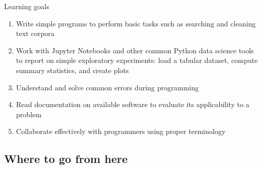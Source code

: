 \documentclass[aspectratio=169,usenames,dvipsnames]{beamer}
\begin{document}
\begin{frame}{Learning goals}
    \begin{enumerate}
        \item Write simple programs to perform basic tasks such as searching
            and cleaning text corpora
        \item Work with Jupyter Notebooks and other common Python data science
            tools to report on simple exploratory experiments:
            load a tabular dataset, compute summary statistics,
            and create plots
        \item Understand and solve common errors during programming
        \item Read documentation on available software to evaluate its
            applicability to a problem
        \item Collaborate effectively with programmers using proper terminology
    \end{enumerate}
\end{frame}

\subsection{Where to go from here}
\frame{\tableofcontents[currentsection]}
\end{document}
